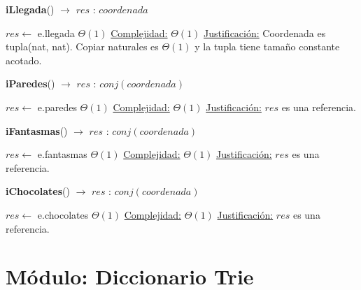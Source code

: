 \documentclass[10pt,a4paper]{article}
\begin{document}
\begin{Algoritmos}
    \begin{algorithm}[H]{\textbf{iLlegada}() $\to$ $res$ : $coordenada$}
        \begin{algorithmic}
            \State $res \gets$ e.llegada \Comment $\Theta(1)$
            \Statex \underline{Complejidad:} $\Theta(1)$
            \Statex \underline{Justificación:} Coordenada es tupla(nat, nat). Copiar naturales es $\Theta(1)$ y la tupla tiene
            tamaño constante acotado.
        \end{algorithmic}
        \end{algorithm}


    \begin{algorithm}[H]{\textbf{iParedes}() $\to$ $res$ : $conj(coordenada)$}
        \begin{algorithmic}
            \State $res \gets$ e.paredes \Comment $\Theta(1)$
            \Statex \underline{Complejidad:} $\Theta(1)$
            \Statex \underline{Justificación:} $res$ es una referencia.
        \end{algorithmic}
        \end{algorithm}

    \begin{algorithm}[H]{\textbf{iFantasmas}() $\to$ $res$ : $conj(coordenada)$}
        \begin{algorithmic}
            \State $res \gets$ e.fantasmas \Comment $\Theta(1)$
            \Statex \underline{Complejidad:} $\Theta(1)$
            \Statex \underline{Justificación:} $res$ es una referencia.
        \end{algorithmic}
        \end{algorithm}

    \begin{algorithm}[H]{\textbf{iChocolates}() $\to$ $res$ : $conj(coordenada)$}
        \begin{algorithmic}
            \State $res \gets$ e.chocolates \Comment $\Theta(1)$
            \Statex \underline{Complejidad:} $\Theta(1)$
            \Statex \underline{Justificación:} $res$ es una referencia.
        \end{algorithmic}
        \end{algorithm}

\end{Algoritmos}

\section{Módulo: Diccionario Trie}
\end{document}
